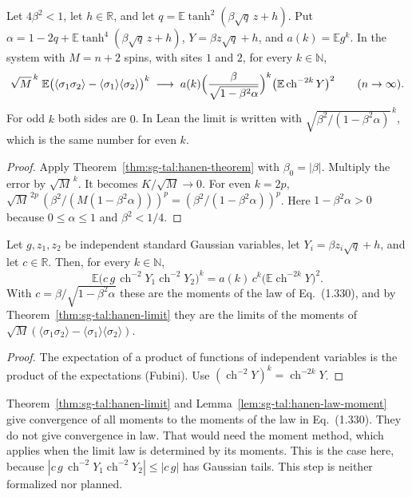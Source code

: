 \begin{theorem}\label{thm:sg-tal:hanen-limit}
\leanok
{}
Let $4\beta^2<1$, let $h\in\mathbb R$, and let $q=\mathbb E\tanh^2(\beta\sqrt q\,z+h)$. Put $\alpha=1-2q+\mathbb E\tanh^4(\beta\sqrt q\,z+h)$,
$Y=\beta z\sqrt q+h$, and $a(k)=\mathbb E g^k$. In the system with $M=n+2$ spins, with sites $1$ and $2$, for every $k\in\mathbb N$,
\[
 \sqrt M^{\,k}\;\mathbb E\bigl(\langle\sigma_1\sigma_2\rangle-\langle\sigma_1\rangle\langle\sigma_2\rangle\bigr)^k
 \;\longrightarrow\; a(k)\Bigl(\frac{\beta}{\sqrt{1-\beta^2\alpha}}\Bigr)^{k}\bigl(\mathbb E\operatorname{ch}^{-2k}Y\bigr)^2
 \qquad (n\to\infty).
\]
For odd $k$ both sides are $0$. In Lean the limit is written with $\sqrt{\beta^2/(1-\beta^2\alpha)}^{\,k}$, which is the same number for even $k$.
\end{theorem}
\begin{proof}
\leanok
Apply Theorem~\ref{thm:sg-tal:hanen-theorem} with $\beta_0=|\beta|$. Multiply the error by $\sqrt M^{\,k}$. It becomes $K/\sqrt M\to0$.
For even $k=2p$, $\sqrt M^{\,2p}\,(\beta^2/(M(1-\beta^2\alpha)))^p=(\beta^2/(1-\beta^2\alpha))^p$. Here $1-\beta^2\alpha>0$ because $0\le\alpha\le1$ and $\beta^2<1/4$.
\end{proof}

\begin{lemma}\label{lem:sg-tal:hanen-law-moment}
\leanok
{}
Let $g,z_1,z_2$ be independent standard Gaussian variables, let $Y_i=\beta z_i\sqrt q+h$, and let $c\in\mathbb R$. Then, for every $k\in\mathbb N$,
\[
 \mathbb E\bigl(c\,g\,\operatorname{ch}^{-2}Y_1\operatorname{ch}^{-2}Y_2\bigr)^k=a(k)\,c^k\bigl(\mathbb E\operatorname{ch}^{-2k}Y\bigr)^2 .
\]
With $c=\beta/\sqrt{1-\beta^2\alpha}$ these are the moments of the law of Eq.~(1.330), and by Theorem~\ref{thm:sg-tal:hanen-limit} they are the limits of the moments of
$\sqrt M(\langle\sigma_1\sigma_2\rangle-\langle\sigma_1\rangle\langle\sigma_2\rangle)$.
\end{lemma}
\begin{proof}
\leanok
The expectation of a product of functions of independent variables is the product of the expectations (Fubini). Use $(\operatorname{ch}^{-2}Y)^k=\operatorname{ch}^{-2k}Y$.
\end{proof}

\begin{remark}\label{rem:sg-tal:hanen-law}
Theorem~\ref{thm:sg-tal:hanen-limit} and Lemma~\ref{lem:sg-tal:hanen-law-moment} give convergence of all moments to the moments of the law in Eq.~(1.330).
They do not give convergence in law. That would need the moment method, which applies when the limit law is determined by its moments.
This is the case here, because $|c\,g\,\operatorname{ch}^{-2}Y_1\operatorname{ch}^{-2}Y_2|\le|c\,g|$ has Gaussian tails. This step is neither formalized nor planned.
\end{remark}

